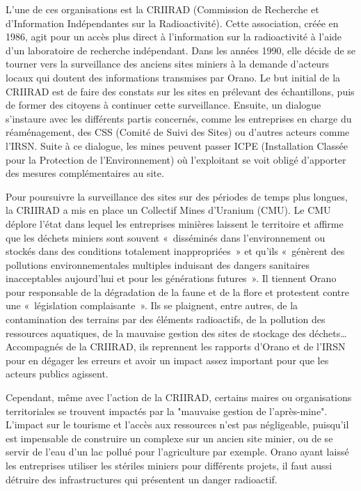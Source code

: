 \documentclass{article}
\begin{document}
L’une de ces organisations est la CRIIRAD (Commission de Recherche et d'Information Indépendantes sur la Radioactivité). Cette association, créée en 1986, agit pour un accès plus direct à l’information sur la radioactivité à l’aide d’un laboratoire de recherche indépendant. Dans les années 1990, elle décide de se tourner vers la surveillance des anciens sites miniers à la demande d’acteurs locaux qui doutent des informations transmises par Orano. Le but initial de la CRIIRAD est de faire des constats sur les sites en prélevant des échantillons, puis de former des citoyens à continuer cette surveillance. Ensuite, un dialogue s'instaure avec les différents partis concernés, comme les entreprises en charge du réaménagement, des CSS (Comité de Suivi des Sites) ou d’autres acteurs comme l’IRSN. Suite à ce dialogue, les mines peuvent passer ICPE (Installation Classée pour la Protection de l'Environnement) où l’exploitant se voit obligé d’apporter des mesures complémentaires au site.

Pour poursuivre la surveillance des sites sur des périodes de temps plus longues, la CRIIRAD a mis en place un Collectif Mines d’Uranium (CMU). Le CMU déplore l’état dans lequel les entreprises minières laissent le territoire et affirme que les déchets miniers sont souvent « disséminés dans l’environnement ou stockés dans des conditions totalement inappropriées » et qu’ils « génèrent des pollutions environnementales multiples induisant des dangers sanitaires inacceptables aujourd’hui et pour les générations futures ». Il tiennent Orano pour responsable de la dégradation de la faune et de la flore et protestent contre une « législation complaisante ». Ils se plaignent, entre autres, de la contamination des terrains par des éléments radioactifs, de la pollution des ressources aquatiques, de la mauvaise gestion des sites de stockage des déchets… Accompagnés de la CRIIRAD, ils reprennent les rapports d’Orano et de l’IRSN pour en dégager les erreurs et avoir un impact assez important pour que les acteurs publics agissent.

Cependant, même avec l’action de la CRIIRAD, certains maires ou organisations territoriales se trouvent impactés par la "mauvaise gestion de l’après-mine". L’impact sur le tourisme et l’accès aux ressources n’est pas négligeable, puisqu’il est impensable de construire un complexe sur un ancien site minier, ou de se servir de l’eau d’un lac pollué pour l’agriculture par exemple. Orano ayant laissé les entreprises utiliser les stériles miniers pour différents projets, il faut aussi détruire des infrastructures qui présentent un danger radioactif.
\end{document}
